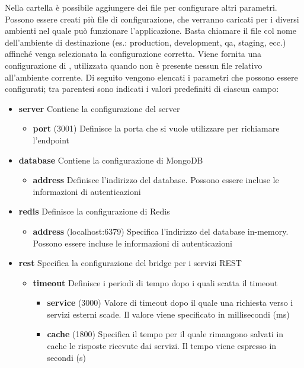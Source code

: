 Nella cartella  è possibile aggiungere dei file per configurare altri parametri. Possono essere creati più file di configurazione, che verranno caricati per i diversi ambienti nel quale può funzionare l'applicazione. Basta chiamare il file col nome dell'ambiente di destinazione (es.: production, development, qa, staging, ecc.) affinché venga selezionata la configurazione corretta. Viene fornita una configurazione di , utilizzata quando non è presente nessun file relativo all'ambiente corrente. Di seguito vengono elencati i parametri che possono essere configurati; tra parentesi sono indicati i valori predefiniti di ciascun campo:

\begin{itemize}
	\item \textbf{server} Contiene la configurazione del server
	\begin{itemize}
		\item \textbf{port} (3001) Definisce la porta che si vuole utilizzare per richiamare l'endpoint
	\end{itemize}
	\item \textbf{database} Contiene la configurazione di MongoDB
	\begin{itemize}
		\item \textbf{address} Definisce l'indirizzo del database. Possono essere incluse le informazioni di autenticazioni
	\end{itemize}
	\item \textbf{redis} Definisce la configurazione di Redis
	\begin{itemize}
		\item \textbf{address} (localhost:6379) Specifica l'indirizzo del database in-memory. Possono essere incluse le informazioni di autenticazioni
	\end{itemize}
	\item \textbf{rest} Specifica la configurazione del bridge per i servizi REST
	\begin{itemize}
		\item \textbf{timeout} Definisce i periodi di tempo dopo i quali scatta il timeout
		\begin{itemize}
			\item \textbf{service} (3000) Valore di timeout dopo il quale una richiesta verso i servizi esterni scade. Il valore viene specificato in millisecondi (ms)
			\item \textbf{cache} (1800) Specifica il tempo per il quale rimangono salvati in cache le risposte ricevute dai servizi. Il tempo viene espresso in secondi (s)

\end{itemize}
\end{itemize}
\end{itemize}
